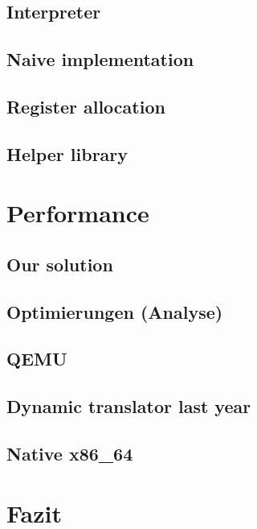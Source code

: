 \documentclass[course=eragp]{aspdoc}
\begin{document}
\subsection{Interpreter}
\subsection{Naive implementation}
\subsection{Register allocation}
\subsection{Helper library}

\section{Performance}
\subsection{Our solution}
\subsection{Optimierungen (Analyse)}
\subsection{QEMU}
\subsection{Dynamic translator last year}
\subsection{Native x86\_64}

\section{Fazit}


{}
\end{document}
